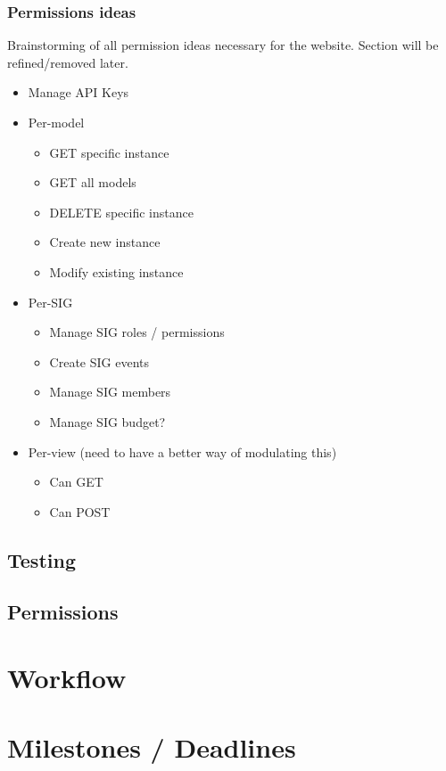 \documentclass{article}
\begin{document}
\subsubsection{Permissions ideas}
Brainstorming of all permission ideas necessary for the website. Section will be
refined/removed later.
\begin{itemize}
    \item Manage API Keys
    \item Per-model
    \begin{itemize}
        \item GET specific instance
        \item GET all models
        \item DELETE specific instance
        \item Create new instance
        \item Modify existing instance
    \end{itemize}

    \item Per-SIG
    \begin{itemize}
        \item Manage SIG roles / permissions
        \item Create SIG events
        \item Manage SIG members
        \item Manage SIG budget?
    \end{itemize}

    \item Per-view (need to have a better way of modulating this)
    \begin{itemize}
        \item Can GET
        \item Can POST
    \end{itemize}


\end{itemize}
\subsection{Testing}
\subsection{Permissions}

\section{Workflow}

\section{Milestones / Deadlines}
\end{document}
